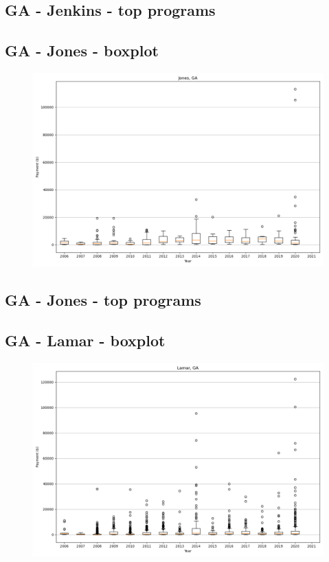 \subsection*{GA - Jenkins - top programs}

\newpage
\subsection*{GA - Jones - boxplot}
\begin{figure}[h]
\centering
\includegraphics[width=7in]{../output/boxplots/counties/Jones-GA_boxplot.png}
\end{figure}


\subsection*{GA - Jones - top programs}

\newpage
\subsection*{GA - Lamar - boxplot}
\begin{figure}[h]
\centering
\includegraphics[width=7in]{../output/boxplots/counties/Lamar-GA_boxplot.png}
\end{figure}


